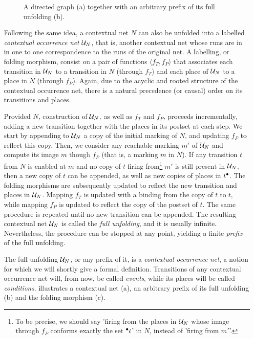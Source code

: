 \documentclass[11pt,a4paper]{article}
\begin{document}
\begin{figure}
\caption{A directed graph (a) together with an arbitrary prefix of its full
unfolding (b).}
\label{fig:a.directed}
\end{figure}

Following the same idea, a contextual net $N$ can also be unfolded into a
labelled \emph{contextual occurrence net} $\mathcal{U}_{N}$, that is, another contextual
net whose runs are in in one to one correspondence to the runs of the original
net.  A labelling, or folding morphism, consist on a pair of functions $\langle
f_T, f_P \rangle$ that associates each transition in $\mathcal{U}_{N}$ to a transition
in $N$ (through $f_T$) and each place of $\mathcal{U}_{N}$ to a place in $N$ (through
$f_P$).  Again, due to the acyclic and rooted structure of the contextual
occurrence net, there is a natural precedence (or causal) order on its
transitions and places.

Provided $N$, construction of $\mathcal{U}_{N}$, as well as $f_T$ and $f_P$, proceeds
incrementally, adding a new transition together with the places in its postset
at each step.  We start by appending to $\mathcal{U}_{N}$ a copy of the initial marking
of $N$, and updating $f_P$ to reflect this copy.  Then, we consider any
reachable marking $m'$ of $\mathcal{U}_{N}$ and compute its image $m$ though $f_P$ (that
is, a marking $m$ in $N$).  If any transition $t$ from $N$ is enabled at $m$
and no copy of $t$ firing from\footnote{To be precise, we should say 'firing
from the places in $\mathcal{U}_{N}$ whose image through $f_P$ conforms exactly the set
${}^\bullet t$' in $N$, instead of 'firing from $m'$'.} $m'$ is still present in
$\mathcal{U}_{N}$, then a new copy of $t$ can be appended, as well as new copies of
places in $t^\bullet$.  The folding morphisms are subsequently updated to reflect
the new transition and places in $\mathcal{U}_{N}$.  Mapping $f_T$ is updated with a
binding from the copy of $t$ to $t$, while mapping $f_P$ is updated to reflect
the copy of the postset of $t$.  The same procedure is repeated until no new
transition can be appended.  The resulting contextual net $\mathcal{U}_{N}$ is called
the \emph{full unfolding}, and it is usually infinite.  Nevertheless, the
procedure can be stopped at any point, yielding a finite \emph{prefix} of the
full unfolding.

The full unfolding $\mathcal{U}_{N}$, or any prefix of it, is a \emph{contextual
occurrence net}, a notion for which we will shortly give a formal definition.
Transitions of any contextual occurrence net will, from now, be called
\emph{events}, while its places will be called \emph{conditions}.
 illustrates a contextual net (a),  an arbitrary prefix of its
full unfolding (b) and the folding morphism (c).
\end{document}
